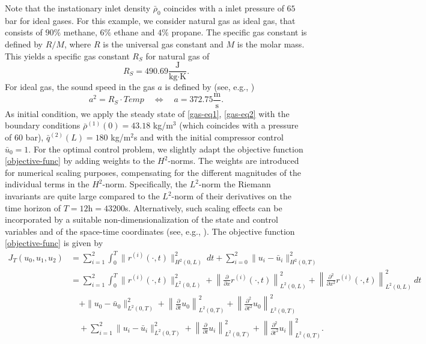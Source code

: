 \documentclass[12pt]{article}
\numberwithin{equation}{section}
\begin{document}
Note that the instationary inlet density $\bar{\rho}_0$ coincides with a inlet pressure of $65$ bar for ideal gases. For this example, we consider natural gas as ideal gas, that consists of $90\%$ methane, $6\%$ ethane and $4\%$ propane. The specific gas constant is defined by $R/M$, where $R$ is the universal gas constant and $M$ is the molar mass. This yields a specific gas constant $R_S$ for natural gas of
\begin{equation*}
	R_S = 490.69 \frac{\text{J}}{\text{kg}\cdot\text{K}}.
\end{equation*}
For ideal gas, the sound speed in the gas $a$ is defined by (see, e.g., \cite{Gas-Modell:DomschkeHillerLangTischendorf2017, GugatSchuster2018})
\begin{equation*}
	a^2 = R_S \cdot Temp \quad \Leftrightarrow \quad a = 372.75 \frac{\text{m}}{\text{s}}.
\end{equation*}
As initial condition, we apply the steady state of \eqref{gas-eq1}, \eqref{gas-eq2} with the boundary conditions $\bar{\rho}^{(1)}(0) = 43.18$ kg/m$^3$ (which coincides with a pressure of $60$ bar), $\bar{q}^{(2)}(L) = 180$ kg/m$^2$s and with the initial compressor control $\bar{u}_0 = 1$. For the optimal control problem, we slightly adapt the objective function \eqref{objective-func} by adding weights to the $H^2$-norms. The weights are introduced for numerical scaling purposes, compensating for the different magnitudes of the individual terms in the $H^2$-norm. Specifically, the $L^2$-norm the Riemann invariants are quite large compared to the $L^2$-norm of their derivatives on the time horizon of $T = 12$h$ = 43200$s. Alternatively, such scaling effects can be incorporated by a suitable non-dimensionalization of the state and control variables and of the space-time coordinates (see, e.g., \cite{SakamotoSchuster2025}). The objective function \eqref{objective-func} is given by
\begin{equation*}
	\begin{aligned}
		J_T(u_0, u_1, u_2) &= \sum_{i=1}^2\int_0^T \|r^{(i)}(\cdot,t)\|^2_{H^2(0,L)}\ dt + \sum_{i=0}^2 \|u_i-\bar{u}_i\|_{H^2(0,T)}^2 \\
		&= \sum_{i=1}^2\int_0^T \|r^{(i)}(\cdot,t)\|^2_{L^2(0,L)} + \left\| \frac{\partial}{\partial x}	r^{(i)}(\cdot,t) \right\|^2_{L^2(0,L)} + \left\| \frac{\partial^2}{\partial x^2}	r^{(i)}(\cdot,t) \right\|^2_{L^2(0,L)}\ dt \\
		&\quad+ \|u_0-\bar{u}_0\|_{L^2(0,T)}^2 + 
        \left\| \frac{\partial}{\partial t} u_0 \right\|_{L^2(0,T)}^2 + \left\| \frac{\partial^2}{\partial t^2} u_0 \right\|_{L^2(0,T)}^2 \\
		&\quad+ \sum_{i=1}^2 \|u_i-\bar{u}_i\|_{L^2(0,T)}^2 + \left\| \frac{\partial}{\partial t} u_i \right\|_{L^2(0,T)}^2 + \left\| \frac{\partial^2}{\partial t^2} u_i \right\|_{L^2(0,T)}^2.
	\end{aligned}
\end{equation*}
\end{document}

